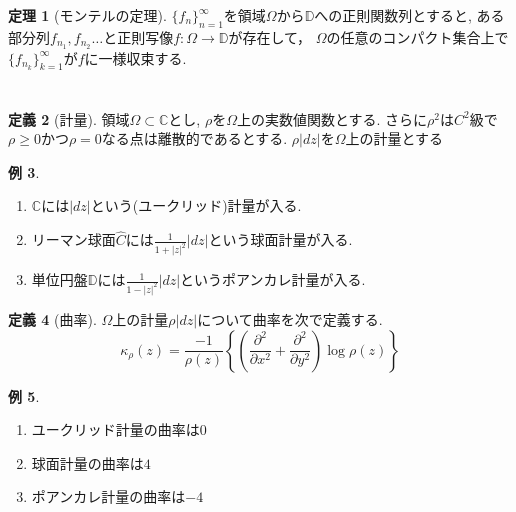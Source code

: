 \documentclass[dvipdfmx,a4paper,11pt]{article}
\newcommand{\C}{\mathbb{C}}
\newcommand{\D}{\mathbb{D}}
\theoremstyle{definition}
\newtheorem{thm}{定理}
\newtheorem{dfn}[thm]{定義}
\newtheorem{exa}[thm]{例}
\newcommand{\pdrv}[2]{\frac{\partial #1}{\partial #2}}
\begin{document}
\begin{tcolorbox}[
    colback = white,
    colframe = green!35!black,
    fonttitle = \bfseries,
    breakable = true]
    \begin{thm}[モンテルの定理]
   $\{ f_{n}\}_{n=1}^{\infty}$を領域$\Omega$から$\D$への正則関数列とすると, ある部分列$f_{n_1}, f_{n_2}\ldots $と正則写像$f: \Omega \rightarrow \D$が存在して，
   $\Omega$の任意のコンパクト集合上で$\{ f_{n_k}\}_{k=1}^{\infty}$が$f$に一様収束する.
    \end{thm}
\end{tcolorbox}

\section{}

\begin{tcolorbox}[
    colback = white,
    colframe = green!35!black,
    fonttitle = \bfseries,
    breakable = true]
    \begin{dfn}[計量]
領域$\Omega \subset \C$とし, $\rho $を$\Omega$上の実数値関数とする.
さらに$\rho^2$は$C^2$級で$\rho \ge 0$かつ$\rho=0$なる点は離散的であるとする.
$\rho|dz|$を$\Omega$上の計量とする
    \end{dfn}
\end{tcolorbox}
\begin{exa}
    \begin{enumerate}
    \setlength{\parskip}{0cm} 
  \setlength{\itemsep}{0cm} 
  \item $\C$には$|dz|$という(ユークリッド)計量が入る.
  \item リーマン球面$\hat{C}$には$\frac{1}{1 + |z|^2} |dz|$という球面計量が入る.
  \item 単位円盤$\D$には$\frac{1}{1 - |z|^2} |dz|$というポアンカレ計量が入る.
  \end{enumerate}
\end{exa}

\begin{tcolorbox}[
    colback = white,
    colframe = green!35!black,
    fonttitle = \bfseries,
    breakable = true]
    \begin{dfn}[曲率]
$\Omega$上の計量$\rho|dz|$について曲率を次で定義する.
$$
\kappa_{\rho}(z)  = \frac{-1}{\rho(z)} \left\{  \left( \pdrv{^2}{x^2} + \pdrv{^2}{y^2}\right) \log \rho(z)\right\}
$$
    \end{dfn}
\end{tcolorbox}
\begin{exa}
    \begin{enumerate}
    \setlength{\parskip}{0cm} 
  \setlength{\itemsep}{0cm} 
  \item ユークリッド計量の曲率は$0$
  \item 球面計量の曲率は$4$
  \item ポアンカレ計量の曲率は$-4$
  \end{enumerate}
\end{exa}
\end{document}
